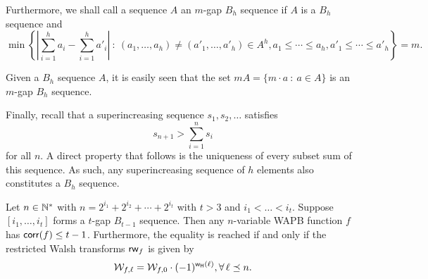 \documentclass[11pt]{llncs}
\begin{document}


Furthermore, we shall call a sequence $A$ an $m$-gap $B_h$ sequence if $A$ is a $B_h$ sequence and
\begin{equation}\label{eq:m-gap_sidon}
\min \left\{ |\sum_{i=1}^ha_i - \sum_{i=1}^ha'_i| ~: ~(a_1,\dots, a_h)\neq (a'_1,\dots, a'_h) \in A^h,  a_1\leq \cdots \leq a_h, a'_1\leq \cdots \leq a'_h \right\} =m.
\end{equation}


Given a $B_h$ sequence $A$, it is easily seen that the set $mA = \{ m \cdot a ~: ~a \in A \}$ is an $m$-gap $B_h$ sequence.

Finally, recall that a superincreasing sequence $s_1, s_2, \ldots$ satisfies
$$
s_{n+1} > \sum_{i=1}^n s_i
$$
for all $n$. A direct property that follows is the uniqueness of every subset
sum of this sequence. As such, any superincreasing sequence of $h$ elements
also constitutes a $B_h$ sequence.









\begin{theorem}\label{prop:infFamily}Let $n\in \mathbb{N}^*$ with $n=2^{i_1}+2^{i_2}+\cdots +2^{i_t}$ with $t>3$ and $i_1<\dots < i_t$.
	Suppose $[i_1,\dots, i_t]$ forms a $t$-gap $B_{t-1}$ sequence.
	Then any $n$-variable WAPB function $f$ has $\mathsf{corr}(f)\leq t-1$. Furthermore,
	the equality is reached if and only if the restricted Walsh transforms
	$\mathsf{rw}_{f}$ is given by
	$$
	\mathcal{W}_{f,\ell} = \mathcal{W}_{f,0} \cdot (-1)^{\mathsf{w_H}(\ell)}, \forall \, \ell \preceq n.
	$$
\end{theorem}

\end{document}
